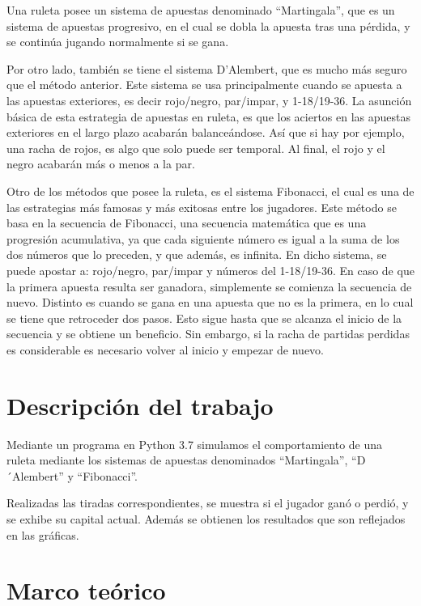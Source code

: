 \documentclass{article}
\begin{document}
    Una ruleta posee un sistema de apuestas denominado ``Martingala'', que es un sistema de apuestas progresivo,
    en el cual se dobla la apuesta tras una pérdida, y se continúa jugando normalmente si se gana.

    Por otro lado, también se tiene el sistema D'Alembert, que es mucho más seguro que el método anterior.
    Este sistema se usa principalmente cuando se apuesta a las apuestas exteriores,
    es decir rojo/negro, par/impar, y 1-18/19-36. La asunción básica de esta estrategia de apuestas en ruleta,
    es que los aciertos en las apuestas exteriores en el largo plazo acabarán balanceándose.
    Así que si hay por ejemplo, una racha de rojos, es algo que solo puede ser temporal.
    Al final, el rojo y el negro acabarán más o menos a la par.

    Otro de los métodos que posee la ruleta, es el sistema Fibonacci, el cual es una de las estrategias
    más famosas y más exitosas entre los jugadores. Este método se basa en la secuencia de Fibonacci,
    una secuencia matemática que es una progresión acumulativa,
    ya que cada siguiente número es igual a la suma de los dos números que lo preceden, y que además,
    es infinita. En dicho sistema, se puede apostar a: rojo/negro, par/impar y números del 1-18/19-36.
    En caso de que la primera apuesta resulta ser ganadora, simplemente se comienza la secuencia de nuevo.
    Distinto es cuando se gana en una apuesta que no es la primera, en lo cual se tiene que retroceder dos pasos.
    Esto sigue hasta que se alcanza el inicio de la secuencia y se obtiene un beneficio.
    Sin embargo, si la racha de partidas perdidas es considerable es necesario volver al inicio y
    empezar de nuevo.








    \section{Descripción del trabajo}
    \label{sec:headings}
    Mediante un programa en Python 3.7 simulamos el comportamiento de una ruleta mediante
    los sistemas de apuestas denominados ``Martingala'', ``D´Alembert'' y ``Fibonacci''.

    Realizadas las tiradas correspondientes, se muestra si el jugador ganó o perdió,
    y se exhibe su capital actual. Además se obtienen los resultados que son reflejados en las gráficas.

    \section{Marco teórico}
\end{document}
